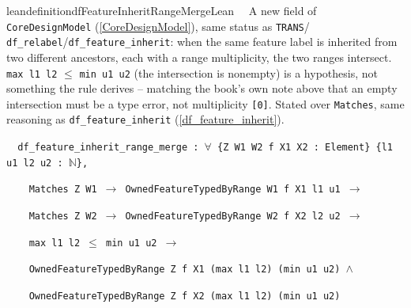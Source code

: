 \begin{restatable}{leandefinition}{dfFeatureInheritRangeMergeLean}~~
A new field of \texttt{CoreDesignModel} (\ref{CoreDesignModel}), same status as \texttt{TRANS}/
\texttt{df\_relabel}/\texttt{df\_feature\_inherit}: when the same feature label is inherited from two
different ancestors, each with a range multiplicity, the two ranges intersect. \texttt{max l1 l2}
$\le$ \texttt{min u1 u2} (the intersection is nonempty) is a hypothesis, not something the rule
derives -- matching the book's own note above that an empty intersection must be a type error, not
multiplicity \texttt{[0]}. Stated over \texttt{Matches}, same reasoning as
\texttt{df\_feature\_inherit} (\ref{df_feature_inherit}).

\texttt{~~df\_feature\_inherit\_range\_merge : $\forall$ \{Z W1 W2 f X1 X2 : Element\} \{l1 u1 l2 u2 : $\mathbb{N}$\},}

\texttt{~~~~Matches Z W1 $\to$ OwnedFeatureTypedByRange W1 f X1 l1 u1 $\to$}

\texttt{~~~~Matches Z W2 $\to$ OwnedFeatureTypedByRange W2 f X2 l2 u2 $\to$}

\texttt{~~~~max l1 l2 $\le$ min u1 u2 $\to$}

\texttt{~~~~OwnedFeatureTypedByRange Z f X1 (max l1 l2) (min u1 u2) $\wedge$}

\texttt{~~~~OwnedFeatureTypedByRange Z f X2 (max l1 l2) (min u1 u2)}
\label{df_feature_inherit_range_merge}
\end{restatable}

